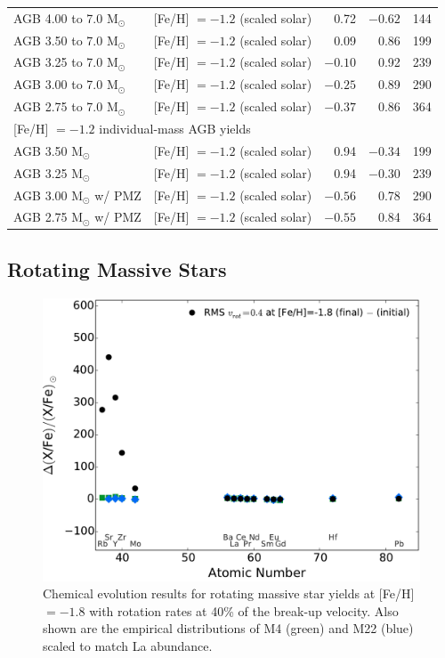\begin{table}[p!]
{\begin{sideways}
\begin{minipage}{200mm}
\begin{tabular}{l l r r r}
\hline
AGB 4.00 to 7.0 M$_\odot$	& [Fe/H] $=-1.2$ (scaled solar)		& 0.72	& $-0.62$	& 144\\
AGB 3.50 to 7.0 M$_\odot$	& [Fe/H] $=-1.2$ (scaled solar)		& 0.09	& 0.86	& 199\\
AGB 3.25 to 7.0 M$_\odot$	& [Fe/H] $=-1.2$ (scaled solar)		& $-0.10$	& 0.92	& 239\\
AGB 3.00 to 7.0 M$_\odot$	& [Fe/H] $=-1.2$ (scaled solar)		& $-0.25$	& 0.89	& 290\\
AGB 2.75 to 7.0 M$_\odot$	& [Fe/H] $=-1.2$ (scaled solar)		& $-0.37$	& 0.86	& 364\\
\hline
\multicolumn{5}{l}{[Fe/H] $=-1.2$ individual-mass AGB yields}\\
\hline
AGB 3.50 M$_\odot$			& [Fe/H] $=-1.2$ (scaled solar)	& 0.94	& $-0.34$	& 199\\
AGB 3.25 M$_\odot$			& [Fe/H] $=-1.2$ (scaled solar)	& 0.94	& $-0.30$	& 239\\
AGB 3.00 M$_\odot$ w/ PMZ		& [Fe/H] $=-1.2$ (scaled solar)	& $-0.56$	& 0.78	& 290\\
AGB 2.75 M$_\odot$ w/ PMZ		& [Fe/H] $=-1.2$ (scaled solar)	& $-0.55$	& 0.84	& 364\\
\end{tabular}\end{minipage}\end{sideways}}
\end{table}

\subsection{Rotating Massive Stars}
\begin{figure}
 \begin{center}\includegraphics[width=1.0\columnwidth]{f4.pdf}\end{center}
 \caption{Chemical evolution results for rotating massive star yields at [Fe/H]$=-1.8$ with rotation rates at 40\% of the break-up velocity. Also shown are the empirical distributions of M4 (green) and M22 (blue) scaled to match La abundance.}
 \label{fig:rmszm3results}
\end{figure}

